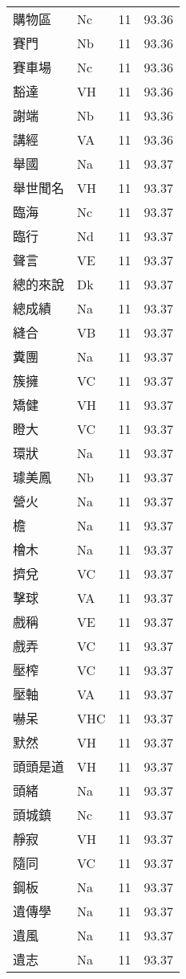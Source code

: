 \documentclass[twocolumn]{book}
\begin{document}
\begin{supertabular}{llrr}
購物區 & Nc & 11 &  93.36\\
賽門 & Nb & 11 &  93.36\\
賽車場 & Nc & 11 &  93.36\\
豁達 & VH & 11 &  93.36\\
謝端 & Nb & 11 &  93.36\\
講經 & VA & 11 &  93.36\\
舉國 & Na & 11 &  93.37\\
舉世聞名 & VH & 11 &  93.37\\
臨海 & Nc & 11 &  93.37\\
臨行 & Nd & 11 &  93.37\\
聲言 & VE & 11 &  93.37\\
總的來說 & Dk & 11 &  93.37\\
總成績 & Na & 11 &  93.37\\
縫合 & VB & 11 &  93.37\\
糞團 & Na & 11 &  93.37\\
簇擁 & VC & 11 &  93.37\\
矯健 & VH & 11 &  93.37\\
瞪大 & VC & 11 &  93.37\\
環狀 & Na & 11 &  93.37\\
璩美鳳 & Nb & 11 &  93.37\\
營火 & Na & 11 &  93.37\\
檐 & Na & 11 &  93.37\\
檜木 & Na & 11 &  93.37\\
擠兌 & VC & 11 &  93.37\\
擊球 & VA & 11 &  93.37\\
戲稱 & VE & 11 &  93.37\\
戲弄 & VC & 11 &  93.37\\
壓榨 & VC & 11 &  93.37\\
壓軸 & VA & 11 &  93.37\\
嚇呆 & VHC & 11 &  93.37\\
默然 & VH & 11 &  93.37\\
頭頭是道 & VH & 11 &  93.37\\
頭緒 & Na & 11 &  93.37\\
頭城鎮 & Nc & 11 &  93.37\\
靜寂 & VH & 11 &  93.37\\
隨同 & VC & 11 &  93.37\\
鋼板 & Na & 11 &  93.37\\
遺傳學 & Na & 11 &  93.37\\
遺風 & Na & 11 &  93.37\\
遺志 & Na & 11 &  93.37\\

\end{supertabular}
\end{document}
